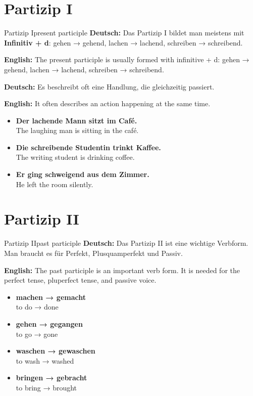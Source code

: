 \documentclass[a4paper,11pt]{article}
\newcommand{\GermanText}[1]{\textbf{Deutsch: }#1\par}
\newcommand{\EnglishText}[1]{{\small\color{SoftGray}\textbf{English: }#1\par}}
\newcommand{\ExampleItem}[2]{\item \textbf{#1}\\{\small\color{SoftGray}#2}}
\begin{document}
\section{Partizip I}

\begin{grammarentry}{Partizip I}{present participle}
\GermanText{Das Partizip I bildet man meistens mit \textbf{Infinitiv + d}: gehen → gehend, lachen → lachend, schreiben → schreibend.}
\EnglishText{The present participle is usually formed with infinitive + d: gehen → gehend, lachen → lachend, schreiben → schreibend.}
\GermanText{Es beschreibt oft eine Handlung, die gleichzeitig passiert.}
\EnglishText{It often describes an action happening at the same time.}

\begin{exbox}
\begin{itemize}
    \ExampleItem{Der lachende Mann sitzt im Café.}{The laughing man is sitting in the café.}
    \ExampleItem{Die schreibende Studentin trinkt Kaffee.}{The writing student is drinking coffee.}
    \ExampleItem{Er ging schweigend aus dem Zimmer.}{He left the room silently.}
\end{itemize}
\end{exbox}
\end{grammarentry}

\section{Partizip II}

\begin{grammarentry}{Partizip II}{past participle}
\GermanText{Das Partizip II ist eine wichtige Verbform. Man braucht es für Perfekt, Plusquamperfekt und Passiv.}
\EnglishText{The past participle is an important verb form. It is needed for the perfect tense, pluperfect tense, and passive voice.}

\begin{exbox}
\begin{itemize}
    \ExampleItem{machen → gemacht}{to do → done}
    \ExampleItem{gehen → gegangen}{to go → gone}
    \ExampleItem{waschen → gewaschen}{to wash → washed}
    \ExampleItem{bringen → gebracht}{to bring → brought}
\end{itemize}
\end{exbox}
\end{grammarentry}
\end{document}
